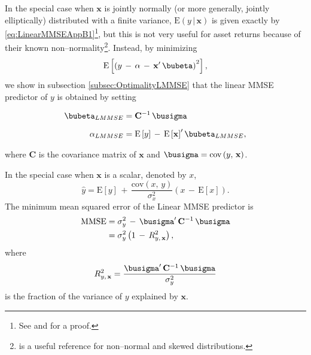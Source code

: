 \documentclass[graybox,envcountchap,sectrefs]{svmono}\usepackage[]{graphicx}\usepackage[]{xcolor}
\begin{document}
\begin{appendices}
In the special case when $\mathrm{\mathbf{x}}$ is jointly normally
(or more generally, jointly elliptically) distributed with a finite
variance, $\mathrm{E}\left(y\,|\,\mathrm{\mathbf{x}}\right)$ is given
exactly by \eqref{eq:LinearMMSEAppB1}\footnote{See \citet{CambanisHuangSimons1981} and \citet{Ding2016} for a proof.},
but this is not very useful for asset returns because of their known
non--normality\footnote{\citet{AzzaliniCapitanio2014} is a useful reference for non--normal
and skewed distributions.}. Instead, by minimizing
\begin{equation}
\mathrm{E}\left[\left(y\,-\,\alpha\,-\,\mathrm{\mathbf{x}}^{\prime}\,\bubeta\right)^{2}\right],\label{eq:LinearMMSEAppB2}
\end{equation}
we show in subsection \ref{subsec:OptimalityLMMSE} that the linear
MMSE predictor of $y$ is obtained by setting

\begin{subequations}
\begin{align}
\bubeta_{LMMSE} & =\mathrm{\mathbf{C}}^{-1}\,\busigma\label{eq:LinearMMSEbetaAppB}\\[0.5em]
\alpha_{LMMSE} & =\mathrm{E}\left[y\right]\,-\,\mathrm{E\left[\mathbf{x}\right]}^{\prime}\,\bubeta_{LMMSE},\label{eq:LinearMMSEalphaAppB}
\end{align}
\end{subequations}

where $\mathbf{C}$ is the covariance matrix of $\mathbf{x}$ and
$\busigma=\mathrm{cov}\left(y,\,\mathbf{x}\right)$.

In the special case when $\mathbf{x}$ is a scalar, denoted by $x$,
\begin{equation}
\hat{y}=\mathrm{E}\left[y\right]\,+\,\frac{\mathrm{cov}\left(x,\,y\right)}{\sigma_{x}^{2}}\left(x\,-\,\mathrm{E}\left[x\right]\right).\label{eq:LinearMMSEAppB4}
\end{equation}
The minimum mean squared error of the Linear MMSE predictor is
\begin{align}
\mathrm{MMSE} & =\sigma_{y}^{2}\,-\,\busigma^{\prime}\,\mathrm{\mathbf{C}}^{-1}\,\busigma\nonumber \\
 & =\sigma_{y}^{2}\left(1\,-\,R_{y,\,\mathbf{x}}^{2}\right),\label{eq:LinearMMSEAppB3}
\end{align}
where
\begin{equation}
R_{y,\,\mathbf{x}}^{2}=\frac{\busigma^{\prime}\,\mathrm{\mathbf{C}}^{-1}\,\busigma}{\sigma_{y}^{2}}\label{eq:RsquaredYx}
\end{equation}
is the fraction of the variance of $y$ explained by $\mathbf{x}$.


\end{appendices}
\end{document}
